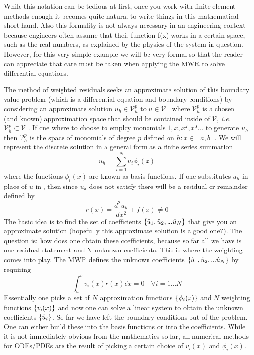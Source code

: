 While this notation can be tedious at first, once you work with finite-element methods enough it becomes quite natural to write things in this mathematical short hand.  Also this formality is not always necessary in an engineering context because engineers often assume that their function f(x) works in a certain space, such as the real numbers, as explained by the physics of the system in question.  However, for this very simple example we will be very formal so that the reader can appreciate that care must be taken when applying the MWR to solve differential equations.  

The method of weighted residuals seeks an approximate solution of this boundary value problem (which is a differential equation and boundary conditions) by considering an approximate solution $u_{h} \in \mathcal{V}_{h}^{p}$ to $u \in \mathcal{V}$ , where $\mathcal{V}_{h}^{p}$ is a chosen (and known) approximation space that should be contained inside of $\mathcal{V}$, \emph{i.e.} $\mathcal{V}_{h}^{p} \subset \mathcal{V}$ .  If one where to choose to employ monomials $1,x,x^{2},x^{3}...$ to generate $u_{h}$ then $\mathcal{V}_{h}^{p}$ is the space of monomials of degree $p$ defined on $h : x \in[a,b]$.  We will represent the discrete solution in a general form as a finite series summation 
\begin{equation}
u_{h}  = \sum_{i = 1}^{N} \hat{u}_{i} \phi_{i}(x)
\end{equation}
where the functions $\phi_{i}(x)$ are known as basis functions.  If one substitutes $u_{h}$ in place of $u$ in , then since $u_{h}$ does not satisfy  there will be a residual or remainder defined by 
\begin{equation}
r(x) = \frac{d^{2} u_{h} }{dx^{2}} + f(x) \ne 0
\end{equation}     
The basic idea is to find the set of coefficients $\left\{  \hat{u}_{1}, \hat{u}_{2},...\hat{u}_{N}  \right\}$ that give you an approximate solution (hopefully this approximate solution is a good one?).  
The question is: how does one obtain these coefficients, because so far all we have is one residual statement and N unknown coefficients.  This is where the weighting comes into play.  The MWR defines the unknown coefficients $\left\{  \hat{u}_{1}, \hat{u}_{2},...\hat{u}_{N}  \right\}$ by requiring 
\begin{equation}
\int_{a}^{b} v_{i}(x) r(x)dx = 0 \quad \forall i = 1...N
\end{equation}
Essentially one picks a set of $N$ approximation functions $\left\{ \phi_{i}(x) \right\}$ and $N$ weighting functions $\left\{ v_{i}(x) \right\}$ and now one can solve a linear system to obtain the unknown coefficients $\left\{ \hat{u}_{i} \right\}$.  So far we have left the boundary conditions out of the problem.  One can either build these into the basis functions or into the coefficients.  While it is not immediately obvious from the mathematics so far, all numerical methods for ODEs/PDEs are the result of picking a certain choice of $v_{i}(x)$ and $\phi_{i}(x)$.  

